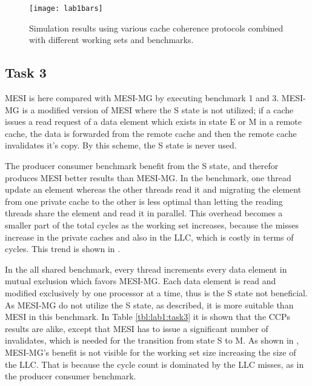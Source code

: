\begin{figure}[t]
	\center
	\texttt{[image: lab1bars]}
	\caption{Simulation results using various cache coherence protocols combined with different working sets and benchmarks.}
	\label{fig:lab1bars}
\end{figure}

\subsection{Task 3}
\label{sec:lab13}
MESI is here compared with MESI-MG by executing benchmark 1 and 3. MESI-MG is a modified version of MESI where the S state is not utilized; if a cache issues a read request of a data element which exists in state E or M in a remote cache, the data is forwarded from the remote cache and then the remote cache invalidates it's copy. By this scheme, the S state is never used.

The producer consumer benchmark benefit from the S state, and therefor produces MESI better results than MESI-MG. In the benchmark, one thread update an element whereas the other threads read it and migrating the element from one private cache to the other is less optimal than letting the reading threads share the element and read it in parallel. This overhead becomes a smaller part of the total cycles as the working set increases, because the misses increase in the private caches and also in the LLC, which is costly in terms of cycles. This trend is shown in . 

In the all shared benchmark, every thread increments every data element in mutual exclusion which favors MESI-MG. Each data element is read and modified exclusively by one processor at a time, thus is the S state not beneficial. As MESI-MG do not utilize the S state, as described, it is more suitable than MESI in this benchmark. In Table \ref{tbl:lab1:task3} it is shown that the CCPs results are alike, except that MESI has to issue a significant number of invalidates, which is needed for the transition from state S to M. As shown in , MESI-MG's benefit is not visible for the working set size increasing the size of the LLC. That is because the cycle count is dominated by the LLC misses, as in the producer consumer benchmark.